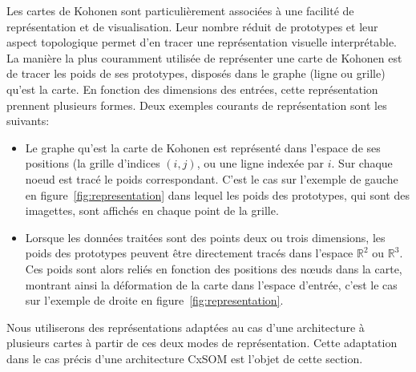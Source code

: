 Les cartes de Kohonen sont particulièrement associées à une facilité de représentation et de visualisation. Leur nombre réduit de prototypes et leur aspect topologique permet d'en tracer une représentation visuelle interprétable.
La manière la plus couramment utilisée de représenter une carte de Kohonen est de tracer les poids de ses prototypes, disposés dans le graphe (ligne ou grille) qu'est la carte. En fonction des dimensions des entrées, cette représentation prennent plusieurs formes. Deux exemples courants de représentation sont les suivants: 
\begin{itemize}
\item Le graphe qu'est la carte de Kohonen est représenté dans l'espace de ses positions (la grille d'indices $(i,j)$, ou une ligne indexée par $i$. Sur chaque noeud est tracé le poids correspondant. C'est le cas sur l'exemple de gauche en figure~\ref{fig:representation} dans lequel les poids des prototypes, qui sont des imagettes, sont affichés en chaque point de la grille. 
\item Lorsque les données traitées sont des points deux ou trois dimensions, les poids des prototypes peuvent être directement tracés dans l'espace $\mathbb{R}^2$ ou $\mathbb{R}^3$. Ces poids sont alors reliés en fonction des positions des n\oe{}uds dans la carte, montrant ainsi la déformation de la carte dans l'espace d'entrée, c'est le cas sur l'exemple de droite en figure~\ref{fig:representation}.
\end{itemize}

Nous utiliserons des représentations adaptées au cas d'une architecture à plusieurs cartes à partir de ces deux modes de représentation. Cette adaptation dans le cas précis d'une architecture CxSOM est l'objet de cette section.

